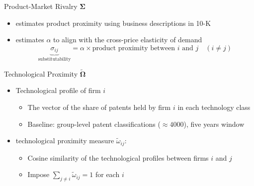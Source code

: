 \documentclass[
  10pt,
  aspectratio=169,   %
]{beamer}
\theoremstyle{plain}
\begin{document}
\begin{frame}{Product-Market Rivalry $\bm{\Sigma}$}

  \begin{itemize}
    \item \label{product_identification} \citet{Hoberg2016-jm} estimates product proximity using business descriptions in 10-K
          \medskip{}
    \item \citet{Pellegrino2024-dn} estimates $\alpha$ to align with the cross-price
          elasticity of demand
          \medskip{}
          \[
            \underbrace{\sigma_{ij}}_{\text{substitutability}}=\alpha\times\text{product proximity between }i\text{ and }j\quad\left(i\neq j\right)
          \]\hyperlink{micro_vs_ghl}{}
  \end{itemize}

\end{frame}

\begin{frame}{Technological Proximity $\widetilde{\bm{\Omega}}$}
  \begin{itemize}
    \item Technological profile of firm $i$
          \begin{itemize}
            \item The vector of the share of patents held by firm $i$ in each technology class
            \item Baseline: group-level patent classifications ($\approx 4000$), five years window
                  \medskip{}
          \end{itemize}
          \medskip{}
    \item \citet{Jaffe1986-yz} technological proximity measure $\tilde{\omega}_{ij}$:
          \begin{itemize}
            \item Cosine similarity of the technological profiles between firms $i$ and $j$
            \item Impose $\sum_{j\neq i}\tilde{\omega}_{ij} = 1$ for each $i$
          \end{itemize}
  \end{itemize}
\end{frame}
\end{document}
